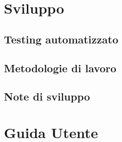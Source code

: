 \chapter{Sviluppo}
\section{Testing automatizzato}
\section{Metodologie di lavoro}
\section{Note di sviluppo}

\chapter{Guida Utente}


